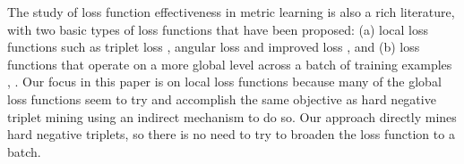 The study of loss function effectiveness in metric learning is also a rich literature, with two basic types of loss functions that have been proposed: (a) local loss functions such as triplet loss \cite{DBLP:conf/cvpr/SchroffKP15}, angular loss \cite{Zhang:2016:DML:3088616.3088665} and improved loss \cite{DBLP:journals/corr/abs-1708-01682}, and (b) loss functions that operate on a more global level across a batch of training examples \cite{NIPS2016_6200}, \cite{songCVPR17}.  Our focus in this paper is on local loss functions because many of the global loss functions seem to try and accomplish the same objective as hard negative triplet mining \cite{songCVPR17} using an indirect mechanism to do so.  Our approach directly mines hard negative triplets, so there is no need to try to broaden the loss function to a batch.
